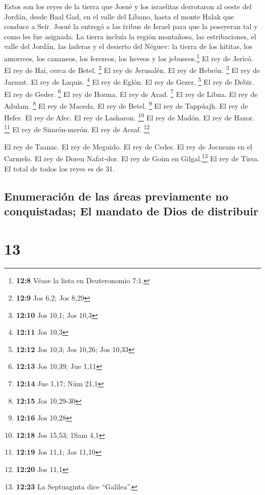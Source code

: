  Estos son los reyes de la tierra que Josué y los
israelitas derrotaron al oeste del Jordán, desde Baal Gad, en el valle
del Líbano, hasta el monte Halak que conduce a Seír. Josué la entregó a
las tribus de Israel para que la poseyeran tal y como les fue asignada.
 La tierra incluía la región montañosa, las estribaciones,
el valle del Jordán, las laderas y el desierto del Néguev: la tierra de
los hititas, los amorreos, los cananeos, los ferezeos, los heveos y los
jebuseos.\footnote{\textbf{12:8} Véase la lista en Deuteronomio 7:1.}
 El rey de Jericó. El rey de Hai, cerca de Betel.
\footnote{\textbf{12:9} Jos 6,2; Jos 8,29}  El rey de
Jerusalén. El rey de Hebrón. \footnote{\textbf{12:10} Jos 10,1; Jos 10,3}
 El rey de Jarmut. El rey de Laquis. \footnote{\textbf{12:11}
  Jos 10,3}  El rey de Eglón. El rey de Gezer.
\footnote{\textbf{12:12} Jos 10,3; Jos 10,26; Jos 10,33} 
El rey de Debir. El rey de Geder. \footnote{\textbf{12:13} Jos 10,39;
  Jue 1,11}  El rey de Horma. El rey de Arad. \footnote{\textbf{12:14}
  Jue 1,17; Núm 21,1}  El rey de Libna. El rey de Adulam.
\footnote{\textbf{12:15} Jos 10,29-30}  El rey de Maceda.
El rey de Betel. \footnote{\textbf{12:16} Jos 10,28}  El
rey de Tappúajh. El rey de Hefer.  El rey de Afec. El rey
de Lasharon. \footnote{\textbf{12:18} Jos 15,53; 1Sam 4,1}
 El rey de Madón. El rey de Hazor. \footnote{\textbf{12:19}
  Jos 11,1; Jos 11,10}  El rey de Simrón-merón. El rey de
Acsaf. \footnote{\textbf{12:20} Jos 11,1}

 El rey de Taanac. El rey de Meguido.  El
rey de Cedes. El rey de Jocneam en el Carmelo.  El rey de
Doren Nafat-dor. El rey de Goim en Gilgal.\footnote{\textbf{12:23} La
  Septuaginta dice ``Galilea''.}  El rey de Tirsa. El
total de todos los reyes es de 31.

\hypertarget{enumeraciuxf3n-de-las-uxe1reas-previamente-no-conquistadas-el-mandato-de-dios-de-distribuir}{%
\subsection{Enumeración de las áreas previamente no conquistadas; El
mandato de Dios de
distribuir}\label{enumeraciuxf3n-de-las-uxe1reas-previamente-no-conquistadas-el-mandato-de-dios-de-distribuir}}

\hypertarget{section-12}{%
\section{13}\label{section-12}}

